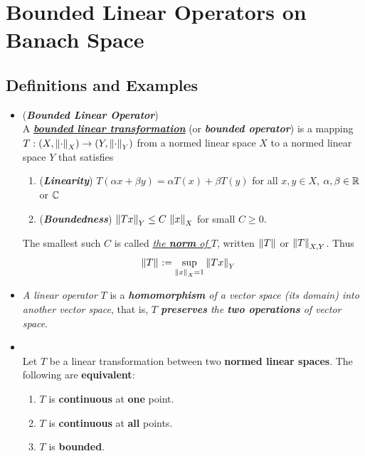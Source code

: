 \documentclass[11pt]{article}
\begin{document}
\section{Bounded Linear Operators on Banach Space}
\subsection{Definitions and Examples}
\begin{itemize}
\item \begin{definition} (\emph{\textbf{Bounded Linear Operator}})\\
A \underline{\emph{\textbf{bounded linear transformation}}} (or \emph{\textbf{bounded operator}}) is a mapping $T: (X, \left\|\cdot\right\|_{X}) \rightarrow (Y, \left\|\cdot\right\|_{Y})$ from a normed linear space $X$ to a normed linear space $Y$ that satisfies 
\begin{enumerate}
\item (\emph{\textbf{Linearity}}) $T(\alpha x + \beta y) = \alpha T(x) + \beta T(y)$ for all $x, y \in X$, $\alpha, \beta \in {\mathbb R}$ or ${\mathbb C}$
\item (\emph{\textbf{Boundedness}}) $\left\|Tx\right\|_{Y} \le C\,\left\|x\right\|_{X}$ for small $C \ge 0$.
\end{enumerate} The smallest such $C$ is called \underline{\emph{the \textbf{norm} of $T$}}, written $\left\|T\right\|_{}$ or $\left\|T\right\|_{X, Y}$. Thus
\begin{align*}
\left\|T\right\|_{} &:= \sup_{\left\|x\right\|_{X} = 1 }\left\|Tx\right\|_{Y}
\end{align*}
\end{definition}

\item \begin{remark}
\emph{A linear operator} $T$ is a \emph{\textbf{homomorphism} of a vector space (its domain) into another vector space}, that is, \emph{$T$ \textbf{preserves} the \textbf{two operations} of vector space}.
\end{remark}

\item \begin{proposition} \citep{reed1980methods, kreyszig1989introductory}\\
Let $T$ be a linear transformation between two \textbf{normed linear spaces}. The following are \textbf{equivalent}:
\begin{enumerate}
\item $T$ is \textbf{continuous} at \textbf{one} point.
\item $T$ is \textbf{continuous} at \textbf{all} points.
\item $T$ is \textbf{bounded}.
\end{enumerate}
\end{proposition}


\end{itemize}
\end{document}
